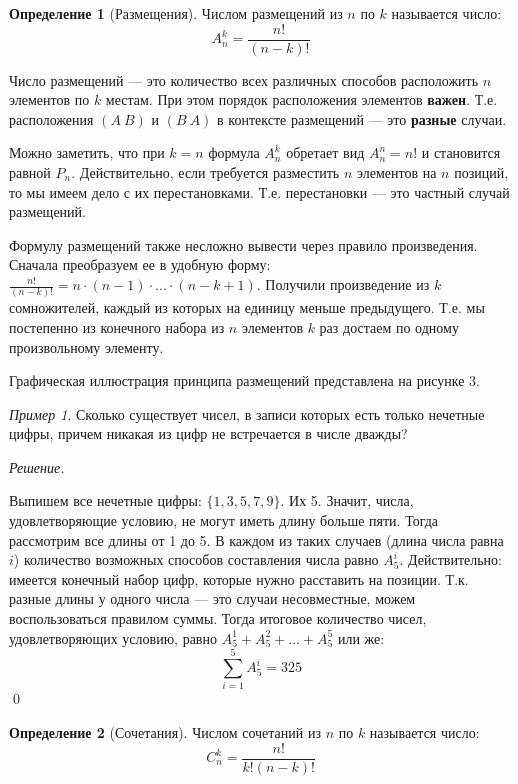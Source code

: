 \documentclass[12pt,a4paper]{article}
\theoremstyle{definition}
\newtheorem{definition}{Определение}[section]
\theoremstyle{definition}
\theoremstyle{remark}
\theoremstyle{corollary}
\newcommand{\nextblock}{\vspace{1.5em}\noindent}
\theoremstyle{bolditalic}
\newtheorem{example}{Пример}[section]
\newenvironment{solution}{
    \vspace{0.5em}
    \noindent\textit{Решение.}
}{\qed\vspace{1em}}
\begin{document}
\begin{definition}[Размещения]
Числом размещений из $n$ по $k$ называется число: 
\[
A_n^k = \frac{n!}{(n-k)!}
\]
\end{definition}

Число размещений --- это количество всех различных способов расположить $n$ элементов по $k$ местам. При этом порядок расположения элементов \textbf{важен}. Т.е. расположения $(A\ B)$ и $(B\ A)$ в контексте размещений --- это \textbf{разные} случаи.

Можно заметить, что при $k = n$ формула $A_n^k$ обретает вид $A_n^n=n!$ и становится равной $P_n$. Действительно, если требуется разместить $n$ элементов на $n$ позиций, то мы имеем дело с их перестановками. Т.е. перестановки --- это частный случай размещений.

Формулу размещений также несложно вывести через правило произведения. Сначала преобразуем ее в удобную форму: $\frac{n!}{(n-k)!}=n\cdot(n-1)\cdot...\cdot(n-k+1)$. Получили произведение из $k$ сомножителей, каждый из которых на единицу меньше предыдущего. Т.е. мы постепенно из конечного набора из $n$ элементов $k$ раз достаем по одному произвольному элементу.

\nextblock

Графическая иллюстрация принципа размещений представлена на рисунке 3.


\begin{example}
    Сколько существует чисел, в записи которых есть только нечетные цифры, причем никакая из цифр не встречается в числе дважды?
\end{example}
\begin{solution}
    Выпишем все нечетные цифры: $\{1, 3, 5, 7, 9\}$. Их 5. Значит, числа, удовлетворяющие условию, не могут иметь длину больше пяти. Тогда рассмотрим все длины от 1 до 5. В каждом из таких случаев (длина числа равна $i$) количество возможных способов составления числа равно $A_5^i$. Действительно: имеется конечный набор цифр, которые нужно расставить на позиции. Т.к. разные длины у одного числа --- это случаи несовместные, можем воспользоваться правилом суммы. Тогда итоговое количество чисел, удовлетворяющих условию, равно $A_5^1 + A_5^2 +...+A_5^5$ или же: $$\sum\limits_{i=1}^{5}{A_5^i}=325$$
\end{solution}

\begin{definition}[Сочетания]
Числом сочетаний из $n$ по $k$ называется число: 
\[
C_n^k = \frac{n!}{k!(n-k)!}
\]
\end{definition}
\end{document}
